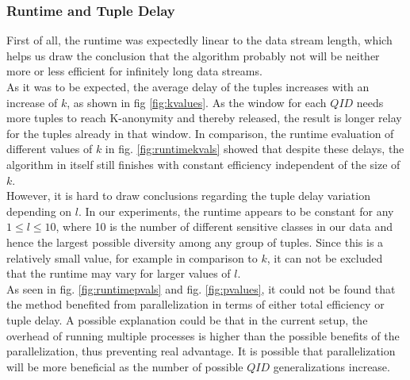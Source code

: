 
\subsubsection{Runtime and Tuple Delay} %

First of all, the runtime was expectedly linear to the data stream length, which helps us draw the conclusion that the algorithm probably not will be neither more or less efficient for infinitely long data streams. \\
As it was to be expected, the average delay of the tuples increases with an increase of $k$, as shown in fig \ref{fig:kvalues}. As the window for each $QID$ needs more tuples to reach K-anonymity and thereby released, the result is longer relay for the tuples already in that window. In comparison, the runtime evaluation of different values of $k$ in fig. \ref{fig:runtimekvals} showed that despite these delays, the algorithm in itself still finishes with constant efficiency independent of the size of $k$. \\
However, it is hard to draw conclusions regarding the tuple delay variation depending on $l$. In our experiments, the runtime appears to be constant for any $1 \leq l \leq 10 $, where 10 is the number of different sensitive classes in our data and hence the largest possible diversity among any group of tuples. Since this is a relatively small value, for example in comparison to $k$, it can not be excluded that the runtime may vary for larger values of $l$. \\
As seen in fig. \ref{fig:runtimepvals} and fig. \ref{fig:pvalues}, it could not be found that the method benefited from parallelization in terms of either total efficiency or tuple delay. A possible explanation could be that in the current setup, the overhead of running multiple processes is higher than the possible benefits of the parallelization, thus preventing real advantage. It is possible that parallelization will be more beneficial as the number of possible $QID$ generalizations increase. 

